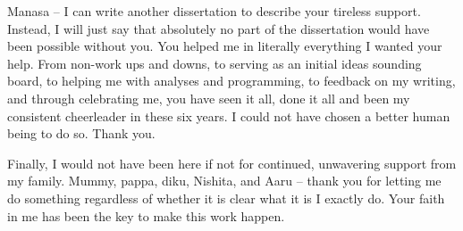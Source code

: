 Manasa -- I can write another dissertation to describe your tireless support. Instead, I will just say that absolutely no part of the dissertation would have been possible without you. You helped me in literally everything I wanted your help. From non-work ups and downs, to serving as an initial ideas sounding board, to helping me with analyses and programming, to feedback on my writing, and through celebrating me, you have seen it all, done it all and been my consistent cheerleader in these six years. I could not have chosen a better human being to do so. Thank you.

Finally, I would not have been here if not for continued, unwavering support from my family. Mummy, pappa, diku, Nishita, and Aaru -- thank you for letting me do something regardless of whether it is clear what it is I exactly do. Your faith in me has been the key to make this work happen.

